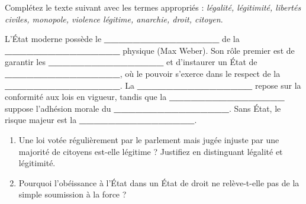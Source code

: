 \documentclass[11pt]{article}
\begin{document}
\begin{exercice}
Complétez le texte suivant avec les termes appropriés : \textit{légalité, légitimité, libertés civiles, monopole, violence légitime, anarchie, droit, citoyen}.

L'État moderne possède le \textbf{\_\_\_\_\_\_\_\_\_\_\_\_\_\_\_\_} de la \textbf{\_\_\_\_\_\_\_\_\_\_\_\_\_\_\_\_} physique (Max Weber). Son rôle premier est de garantir les \textbf{\_\_\_\_\_\_\_\_\_\_\_\_\_\_\_\_} et d'instaurer un État de \textbf{\_\_\_\_\_\_\_\_\_\_\_\_\_\_\_\_}, où le pouvoir s'exerce dans le respect de la \textbf{\_\_\_\_\_\_\_\_\_\_\_\_\_\_\_\_}. La \textbf{\_\_\_\_\_\_\_\_\_\_\_\_\_\_\_\_} repose sur la conformité aux lois en vigueur, tandis que la \textbf{\_\_\_\_\_\_\_\_\_\_\_\_\_\_\_\_} suppose l'adhésion morale du \textbf{\_\_\_\_\_\_\_\_\_\_\_\_\_\_\_\_}. Sans État, le risque majeur est la \textbf{\_\_\_\_\_\_\_\_\_\_\_\_\_\_\_\_}.
\end{exercice}

\begin{exercice}
\begin{enumerate}
    \item Une loi votée régulièrement par le parlement mais jugée injuste par une majorité de citoyens est-elle légitime ? Justifiez en distinguant légalité et légitimité.
    \item Pourquoi l'obéissance à l'État dans un État de droit ne relève-t-elle pas de la simple soumission à la force ?
\end{enumerate}
\end{exercice}
\end{document}
